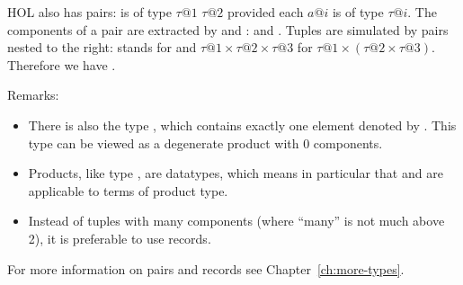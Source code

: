 %
\begin{isabellebody}%
\def\isabellecontext{pairs}%
%
\begin{isamarkuptext}%
\label{sec:pairs}
HOL also has pairs:  is of type $\tau@1$
 $\tau@2$ provided each $a@i$ is of type
$\tau@i$. The components of a pair are extracted by  and
:
  and . Tuples
are simulated by pairs nested to the right:  stands
for  and $\tau@1 \times \tau@2 \times \tau@3$ for
$\tau@1 \times (\tau@2 \times \tau@3)$. Therefore we have
.

Remarks:
\begin{itemize}
\item
There is also the type , which contains exactly one
element denoted by . This type can be viewed
as a degenerate product with 0 components.
\item
Products, like type , are datatypes, which means
in particular that  and  are applicable to
terms of product type.
\item
Instead of tuples with many components (where ``many'' is not much above 2),
it is preferable to use records.
\end{itemize}
For more information on pairs and records see Chapter~\ref{ch:more-types}.%
\end{isamarkuptext}%
\end{isabellebody}%
